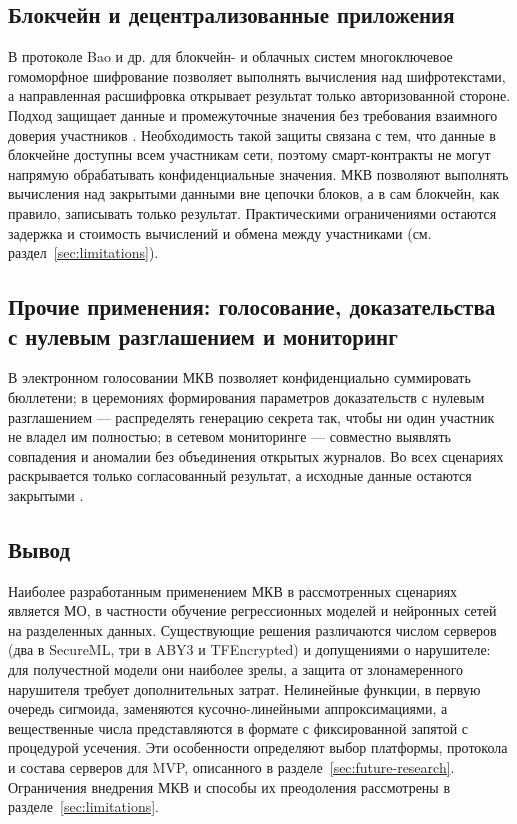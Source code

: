 \subsection{Блокчейн и децентрализованные приложения}

В протоколе Bao и др. для блокчейн- и облачных систем многоключевое гомоморфное шифрование позволяет выполнять вычисления над шифротекстами, а направленная расшифровка открывает результат только авторизованной стороне. Подход защищает данные и промежуточные значения без требования взаимного доверия участников \cite{05}. Необходимость такой защиты связана с тем, что данные в блокчейне доступны всем участникам сети, поэтому смарт-контракты не могут напрямую обрабатывать конфиденциальные значения. МКВ позволяют выполнять вычисления над закрытыми данными вне цепочки блоков, а в сам блокчейн, как правило, записывать только результат. Практическими ограничениями остаются задержка и стоимость вычислений и обмена между участниками (см. раздел~\ref{sec:limitations}).

\subsection{Прочие применения: голосование, доказательства с нулевым разглашением и мониторинг}

В электронном голосовании МКВ позволяет конфиденциально суммировать бюллетени; в церемониях формирования параметров доказательств с нулевым разглашением --- распределять генерацию секрета так, чтобы ни один участник не владел им полностью; в сетевом мониторинге --- совместно выявлять совпадения и аномалии без объединения открытых журналов. Во всех сценариях раскрывается только согласованный результат, а исходные данные остаются закрытыми \cite{06}.

\subsection{Вывод}

Наиболее разработанным применением МКВ в рассмотренных сценариях является МО, в частности обучение регрессионных моделей и нейронных сетей на разделенных данных. Существующие решения различаются числом серверов (два в SecureML, три в ABY3 и TFEncrypted) и допущениями о нарушителе: для получестной модели они наиболее зрелы, а защита от злонамеренного нарушителя требует дополнительных затрат. Нелинейные функции, в первую очередь сигмоида, заменяются кусочно-линейными аппроксимациями, а вещественные числа представляются в формате с фиксированной запятой с процедурой усечения. Эти особенности определяют выбор платформы, протокола и состава серверов для MVP, описанного в разделе~\ref{sec:future-research}. Ограничения внедрения МКВ и способы их преодоления рассмотрены в разделе~\ref{sec:limitations}.
